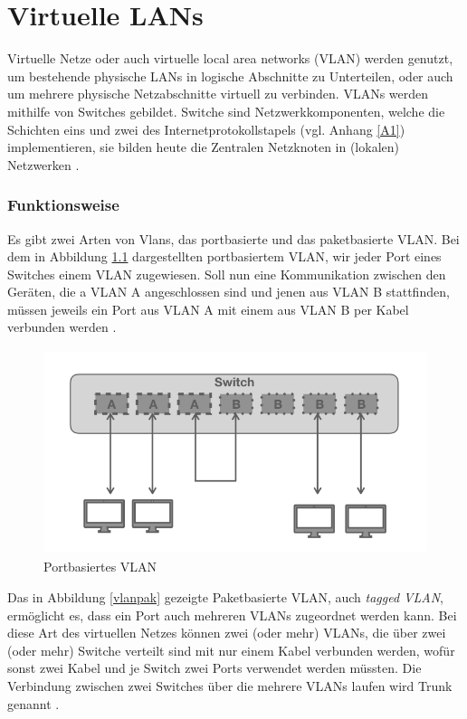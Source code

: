 \chapter{Virtuelle LANs}

Virtuelle Netze oder auch virtuelle local area networks (VLAN) werden genutzt, um bestehende physische LANs in logische Abschnitte zu Unterteilen, oder auch um mehrere physische Netzabschnitte virtuell zu verbinden. VLANs werden mithilfe von Switches gebildet. Switche sind Netzwerkkomponenten, welche die Schichten eins und zwei des Internetprotokollstapels (vgl. Anhang \ref{A1}) implementieren, sie bilden heute die Zentralen Netzknoten in (lokalen) Netzwerken \cite{zisler2018computer}. 


\subsection{Funktionsweise}


Es gibt zwei Arten von Vlans, das portbasierte und das paketbasierte VLAN. 
Bei dem in Abbildung \ref{vlanport} dargestellten portbasiertem VLAN, wir jeder Port eines Switches einem VLAN zugewiesen. Soll nun eine Kommunikation zwischen den Geräten, die a VLAN A angeschlossen sind und jenen aus VLAN B stattfinden, müssen jeweils ein Port aus VLAN A mit einem aus VLAN B per Kabel verbunden werden \cite{zisler2018computer}. %


\begin{figure}[h]
\centering
	\includegraphics[width=0.8\linewidth, height= 6cm]{vlanport.001.png}
	\caption{Portbasiertes VLAN}
	\label{vlanport}
\end{figure}


Das in Abbildung \ref{vlanpak} gezeigte Paketbasierte VLAN, auch \emph{tagged VLAN}, ermöglicht es, dass ein Port auch mehreren VLANs zugeordnet werden kann. Bei  diese Art des virtuellen Netzes können zwei (oder mehr) VLANs, die über zwei (oder mehr)  Switche verteilt sind mit nur einem Kabel verbunden werden, wofür sonst zwei Kabel und je Switch zwei Ports verwendet werden müssten. Die Verbindung zwischen zwei Switches über die mehrere VLANs laufen wird Trunk genannt \cite{cisco14rout}. 


